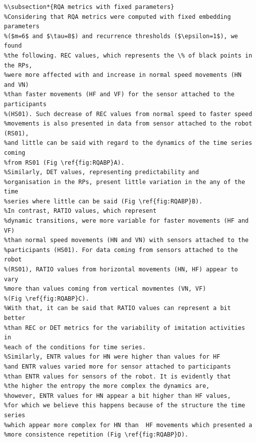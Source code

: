 \documentclass[10pt]{article}
\begin{document}
\begin{verbatim}
%\subsection*{RQA metrics with fixed parameters}
%Considering that RQA metrics were computed with fixed embedding parameters 
%($m=6$ and $\tau=8$) and recurrence thresholds ($\epsilon=1$), we found 
%the following. REC values, which represents the \% of black points in the RPs, 
%were more affected with and increase in normal speed movements (HN and VN) 
%than faster movements (HF and VF) for the sensor attached to the participants 
%(HS01). Such decrease of REC values from normal speed to faster speed 
%movements is also presented in data from sensor attached to the robot (RS01), 
%and little can be said with regard to the dynamics of the time series coming 
%from RS01 (Fig \ref{fig:RQABP}A).
%Similarly, DET values, representing predictability and 
%organisation in the RPs, present little variation in the any of the time 
%series where little can be said (Fig \ref{fig:RQABP}B).
%In contrast, RATIO values, which represent 
%dynamic transitions, were more variable for faster movements (HF and VF) 
%than normal speed movements (HN and VN) with sensors attached to the 
%participants (HS01). For data coming from sensors attached to the robot 
%(RS01), RATIO values from horizontal movements (HN, HF) appear to vary 
%more than values coming from vertical movmentes (VN, VF) 
%(Fig \ref{fig:RQABP}C).
%With that, it can be said that RATIO values can represent a bit better
%than REC or DET metrics for the variability of imitation activities in 
%each of the conditions for time series.
%Similarly, ENTR values for HN were higher than values for HF
%and ENTR values varied more for sensor attached to participants 
%than ENTR values for sensors of the robot. It is evidently that 
%the higher the entropy the more complex the dynamics are, 
%however, ENTR values for HN appear a bit higher than HF values, 
%for which we believe this happens because of the structure the time series
%which appear more complex for HN than  HF movements which presented a 
%more consistence repetition (Fig \ref{fig:RQABP}D).



\end{verbatim}
\end{document}
